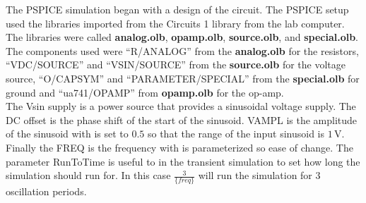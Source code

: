 \documentclass[11pt]{article}
\begin{document}
The PSPICE simulation began with a design of the circuit. The PSPICE setup used the libraries imported from the Circuits 1 library from the lab computer. The libraries were called \textbf{analog.olb}, \textbf{opamp.olb}, \textbf{source.olb}, and \textbf{special.olb}. The components used were ``R/ANALOG'' from the \textbf{analog.olb} for the resistors, ``VDC/SOURCE'' and ``VSIN/SOURCE'' from the \textbf{source.olb} for the voltage source, ``O/CAPSYM'' and ``PARAMETER/SPECIAL'' from the \textbf{special.olb} for ground and ``ua741/OPAMP'' from \textbf{opamp.olb} for the op-amp.\\

The Vsin supply is a power source that provides a sinusoidal voltage supply. The DC offset is the phase shift of the start of the sinusoid. VAMPL is the amplitude of the sinusoid with is set to $0.5$ so that the range of the input sinusoid is $1\,\si\volt$. Finally the FREQ is the frequency with is parameterized so ease of change. The parameter RunToTime is useful to in the transient simulation to set how long the simulation should run for. In this case $\frac{3}{\{freq\}}$ will run the simulation for 3 oscillation periods.

\end{document}
